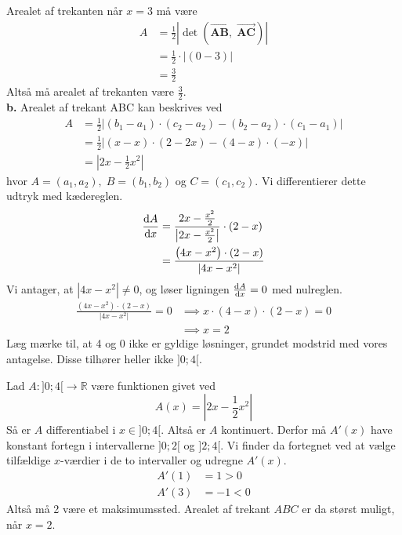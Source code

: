 \documentclass{article}
\begin{document}
Arealet af trekanten når $x=3$ må være 
\begin{equation*}
\begin{split}
  A&=\frac{1}{2}\left| \det \left(\overrightarrow{\textbf{AB}} ,\;\overrightarrow{\textbf{AC}} \right)  \right| \\ 
  &=\frac{1}{2}\cdot \left| \left(0-3\right)  \right| \\ 
  &=\frac{3}{2}
\end{split}
\end{equation*}
Altså må arealet af trekanten være $\frac{3}{2}$.\\[1ex]
\textbf{b.} 
Arealet af trekant ABC kan beskrives ved
\begin{equation*}
\begin{split}
  A&=\frac{1}{2}\left| (b_1-a_1)\cdot (c_2-a_2)-(b_2-a_2)\cdot (c_1-a_1) \right| \\ 
  &=\frac{1}{2}\left| (x-x)\cdot (2-2x)-(4-x)\cdot (-x) \right| \\ 
  &=\left| 2x-\frac{1}{2}x^2 \right| 
\end{split}
\end{equation*}
hvor $A=(a_1,a_2),\;B=(b_1,b_2)$ og $C=(c_1,c_2)$.
Vi differentierer dette udtryk med kædereglen.
\begin{equation*}
\begin{split}
  \dv{A}{x} &= \frac{2x-\frac{x^2}{2}}{\left| 2x-\frac{x^2}{2} \right| }\cdot \left(2-x\right) \\ 
  &=\frac{\left(4x-x^2\right) \cdot \left(2-x\right) }{\left| 4x-x^2 \right| }
\end{split}
\end{equation*}
Vi antager, at $\left| 4x-x^2 \right| \neq 0$, og løser ligningen $\dv{A}{x}=0 $ med nulreglen. 
\begin{equation*}
\begin{split}
  \frac{\left(4x-x^2\right) \cdot \left(2-x\right) }{\left| 4x-x^2 \right| }=0 &\implies x\cdot (4-x) \cdot (2-x)=0 \\ 
  &\implies x=2
\end{split}
\end{equation*}
Læg mærke til, at 4 og 0 ikke er gyldige løsninger, grundet modstrid med vores antagelse. 
Disse tilhører heller ikke $]0;4[$.

Lad $A:]0;4[ \to \mathbb{R} $ være funktionen givet ved 
\[
A(x)=\left| 2x-\frac{1}{2}x^2 \right| 
\] 
Så er $A$ differentiabel i $x \in ]0;4[$.
Altså er $A$ kontinuert. 
Derfor må $A'(x)$ have konstant fortegn i intervallerne $]0;2[$ og $]2;4[$.
Vi finder da fortegnet ved at vælge tilfældige $x$-værdier i de to intervaller og udregne $A'(x)$.
\begin{equation*}
\begin{split}
  A'(1)&=1>0 \\ 
  A'(3)&=-1<0
\end{split}
\end{equation*}
Altså må 2 være et maksimumssted.
Arealet af trekant $ABC$ er da størst muligt, når $x=2$.
\end{document}
